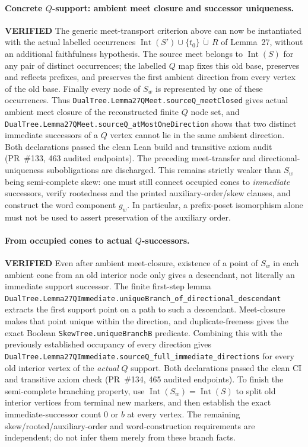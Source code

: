\documentclass[11pt]{article}
\newcommand{\ok}{\textcolor{green!40!black}{\textbf{VERIFIED}}}
\newcommand{\lean}[1]{\texttt{#1}}
\begin{document}
\paragraph{Concrete $Q$-support: ambient meet closure and successor uniqueness.} \ok
The generic meet-transport criterion above can now be instantiated
with the actual labelled occurrences
$\operatorname{Int}(S')\cup\{t_0\}\,\dot\cup\,R$
of Lemma~27, without an additional faithfulness hypothesis.
The source meet belongs to $\operatorname{Int}(S)$ for any pair of
distinct occurrences; the labelled $Q$ map fixes this old base,
preserves and reflects prefixes, and preserves the first ambient
direction from every vertex of the old base. Finally every node of
$S_w$ is represented by one of these occurrences. Thus
\lean{DualTree.Lemma27QMeet.sourceQ_meetClosed} gives actual
ambient meet closure of the reconstructed finite $Q$ node set, and
\lean{DualTree.Lemma27QMeet.sourceQ_atMostOneDirection}
shows that two distinct immediate successors of a $Q$ vertex
cannot lie in the same ambient direction.
Both declarations passed the clean Lean build and transitive axiom
audit (PR~\#133, 463 audited endpoints). The preceding
meet-transfer and directional-uniqueness subobligations are discharged.
This remains strictly weaker than $S_w$ being semi-complete skew:
one must still connect occupied cones to \emph{immediate} successors,
verify rootedness and the printed auxiliary-order/skew clauses,
and construct the word component $g_w$. In particular, a
prefix-poset isomorphism alone must not be used to assert
preservation of the auxiliary order.

\paragraph{From occupied cones to actual $Q$-successors.} \ok
Even after ambient meet-closure, existence of a point of $S_w$ in
each ambient cone from an old interior node only gives a descendant,
not literally an immediate support successor.  The finite first-step
lemma \lean{DualTree.Lemma27QImmediate.uniqueBranch_of_directional_descendant}
extracts the first support point on a path to such a descendant.
Meet-closure makes that point unique within the direction,
and duplicate-freeness gives the exact Boolean
\lean{SkewTree.uniqueBranchB} predicate.  Combining this with the
previously established occupancy of every direction gives
\lean{DualTree.Lemma27QImmediate.sourceQ_full_immediate_directions}
for every old interior vertex of the \emph{actual} $Q$ support.
Both declarations passed the clean CI and transitive axiom check
(PR~\#134, 465 audited endpoints).
To finish the semi-complete branching property, use
$\operatorname{Int}(S_w)=\operatorname{Int}(S)$ to split old interior
vertices from terminal new markers, and then establish the exact
immediate-successor count $0$ or $b$ at every vertex.  The
remaining skew/rooted/auxiliary-order and word-construction
requirements are independent; do not infer them merely from
these branch facts.
\end{document}
